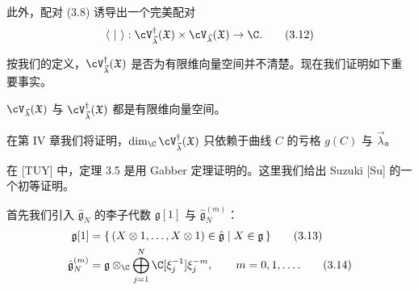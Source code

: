此外，配对 (3.8) 诱导出一个完美配对
\begin{equation}
\langle\ |\ \rangle:\cV^{\dagger}_{\vec{\lambda}}(\mathfrak{X})\times\cV_{\vec{\lambda}}(\mathfrak{X})\to\C. \tag{3.12}
\end{equation}


按我们的定义，$\cV^{\dagger}_{\vec{\lambda}}(\mathfrak{X})$ 是否为有限维向量空间并不清楚。现在我们证明如下重要事实。

\begin{theorem}[3.5]
$\cV_{\vec{\lambda}}(\mathfrak{X})$ 与 $\cV^{\dagger}_{\vec{\lambda}}(\mathfrak{X})$ 都是有限维向量空间。
\end{theorem}

在第 IV 章我们将证明，$\dim_{\C}\cV^{\dagger}_{\vec{\lambda}}(\mathfrak{X})$ 只依赖于曲线 $C$ 的亏格 $g(C)$ 与 $\vec{\lambda}$。

在 [TUY] 中，定理 3.5 是用 Gabber 定理证明的。这里我们给出 Suzuki [Su] 的一个初等证明。

首先我们引入 $\hat{\mathfrak{g}}_N$ 的李子代数 $\mathfrak{g}[1]$ 与 $\hat{\mathfrak{g}}_N^{(m)}$：
\begin{align}
\mathfrak{g}[1]&=\{\,(X\otimes 1,\dots,X\otimes 1)\in\hat{\mathfrak{g}}\mid X\in\mathfrak{g}\,\} \tag{3.13}\\
\hat{\mathfrak{g}}_N^{(m)}&=\mathfrak{g}\otimes_{\C}\bigoplus_{j=1}^{N}\C[\xi_j^{-1}]\xi_j^{-m},\qquad m=0,1,\dots. \tag{3.14}
\end{align}


